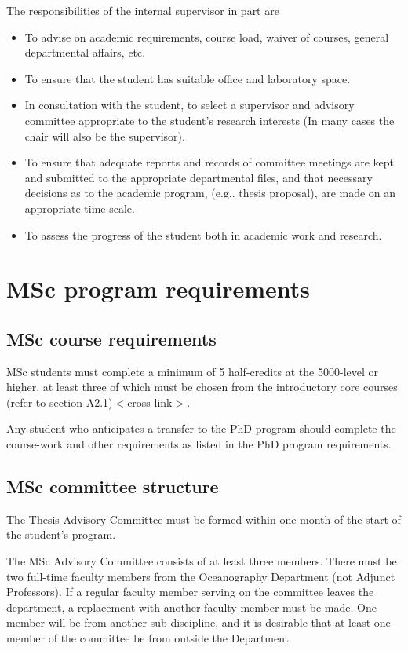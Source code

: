 \documentclass{article}
\newcommand{\fixme}[1]{\color{red}$<$#1$>$\color{black}\index{$>>>>$FIXME$<<<<$}}
\begin{document}
The responsibilities of the internal supervisor in part are
\begin{itemize}
\item To advise on academic requirements, course load, waiver of courses, general departmental affairs, etc.
\item To ensure that the student has suitable office and laboratory space.
\item In consultation with the student, to select a supervisor and advisory committee appropriate to the student's research interests (In many cases the chair will also be the supervisor).
\item To ensure that adequate reports and records of committee meetings are kept and submitted to the appropriate departmental files, and that necessary decisions as to the academic program, (e.g.. thesis proposal), are made on an appropriate time-scale.
\item To assess the progress of the student both in academic work and research.
\end {itemize}
 


\section{MSc program requirements}


\subsection{MSc course requirements}

MSc students must complete a minimum of 5 half-credits at the 5000-level or
higher, at least three of which must be chosen from the introductory core
courses (refer to section A2.1)\fixme{cross link}.

Any student who anticipates a transfer to the PhD program should complete the
course-work and other requirements as listed in the PhD program requirements.

\subsection{MSc committee structure}

The Thesis Advisory Committee must be formed within one month of the start of
the student’s program.

The MSc Advisory Committee consists of at least three members. There must be
two full-time faculty members from the Oceanography Department (not Adjunct
Professors). If a regular faculty member serving on the committee leaves the
department, a replacement with another faculty member must be made. One member
will be from another sub-discipline, and it is desirable that at least one
member of the committee be from outside the Department.
\end{document}
